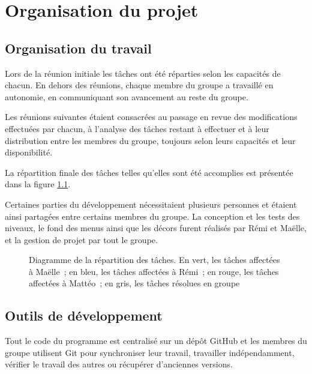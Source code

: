 \chapter{Organisation du projet}

\section{Organisation du travail}

Lors de la réunion initiale les tâches ont été réparties selon les capacités
de chacun. En dehors des réunions, chaque membre du groupe a travaillé en
autonomie, en communiquant son avancement au reste du groupe.

Les réunions suivantes étaient consacrées au passage en revue des modifications
effectuées par chacun, à l'analyse des tâches restant à effectuer et à leur
distribution entre les membres du groupe, toujours selon leurs capacités
et leur disponibilité.

La répartition finale des tâches telles qu'elles sont été accomplies
est présentée dans la figure \ref{fig:organisation-gantt}.

Certaines parties du développement nécessitaient plusieurs personnes et
étaient ainsi partagées entre certains membres du groupe. La conception
et les tests des niveaux, le fond des menus ainsi que les décors furent
réalisés par Rémi et Maëlle, et la gestion de projet par tout le groupe.

\begin{figure}[p!]
    \centering
    
    \caption{
        Diagramme de la répartition des tâches. En vert, les tâches
        affectées à Maëlle~; en bleu, les tâches affectées à Rémi~;
        en rouge, les tâches affectées à Mattéo~; en gris, les
        tâches résolues en groupe
    }
    \label{fig:organisation-gantt}
\end{figure}
\restoregeometry

\section{Outils de développement}

Tout le code du programme est centralisé sur un dépôt GitHub et les membres
du groupe utilisent Git pour synchroniser leur travail, travailler
indépendamment, vérifier le travail des autres ou récupérer
d'anciennes versions.
\cite{organisation-github-skizzle}

